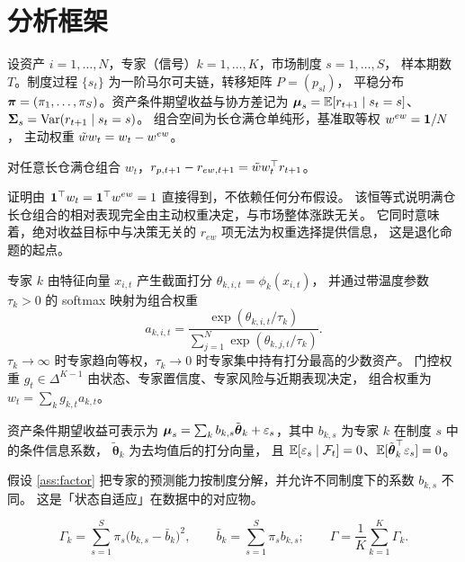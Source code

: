 \section{分析框架}
\label{sec:framework}

设资产 $i=1,\dots,N$，专家（信号）$k=1,\dots,K$，市场制度 $s=1,\dots,S$，
样本期数 $T$。制度过程 $\{s_t\}$ 为一阶马尔可夫链，转移矩阵 $P=(p_{sl})$，
平稳分布 $\boldsymbol{\pi}=(\pi_1,\dots,\pi_S)$。资产条件期望收益与协方差记为
$\boldsymbol{\mu}_s=\mathbb{E}[r_{t+1}\mid s_t=s]$、$\boldsymbol{\Sigma}_s=\mathrm{Var}(r_{t+1}\mid s_t=s)$。
组合空间为长仓满仓单纯形，基准取等权 $w^{ew}=\mathbf{1}/N$，
主动权重 $\tilde{w} w_t=w_t-w^{ew}$。

\begin{lemma}[基准恒等式]
\label{lem:identity}
对任意长仓满仓组合 $w_t$，$r_{p,t+1}-r_{ew,t+1}=\tilde{w} w_t^\top r_{t+1}$。
\end{lemma}

证明由 $\mathbf{1}^\top w_t=\mathbf{1}^\top w^{ew}=1$ 直接得到，不依赖任何分布假设。
该恒等式说明满仓长仓组合的相对表现完全由主动权重决定，与市场整体涨跌无关。
它同时意味着，绝对收益目标中与决策无关的 $r_{ew}$ 项无法为权重选择提供信息，
这是退化命题的起点。

专家 $k$ 由特征向量 $x_{i,t}$ 产生截面打分 $\theta_{k,i,t}=\phi_k(x_{i,t})$，
并通过带温度参数 $\tau_k>0$ 的 softmax 映射为组合权重
\begin{equation}
a_{k,i,t}=\frac{\exp(\theta_{k,i,t}/\tau_k)}{\sum_{j=1}^N\exp(\theta_{k,j,t}/\tau_k)} .
\label{eq:softmax-expert}
\end{equation}
$\tau_k\to\infty$ 时专家趋向等权，$\tau_k\to0$ 时专家集中持有打分最高的少数资产。
门控权重 $g_t\in\Delta^{K-1}$ 由状态、专家置信度、专家风险与近期表现决定，
组合权重为 $w_t=\sum_k g_{k,t}a_{k,t}$。

\begin{assumption}[制度切换因子结构]
\label{ass:factor}
资产条件期望收益可表示为 $\boldsymbol{\mu}_s=\sum_{k}b_{k,s}\tilde{\boldsymbol\theta}_{k}
+\varepsilon_s$，其中 $b_{k,s}$ 为专家 $k$ 在制度 $s$ 中的条件信息系数，
$\tilde{\boldsymbol\theta}_k$ 为去均值后的打分向量，
且 $\mathbb{E}[\varepsilon_s\mid\mathcal{F}_t]=0$、$\mathbb{E}[\tilde{\boldsymbol\theta}_k^\top\varepsilon_s]=0$。
\end{assumption}

假设 \ref{ass:factor} 把专家的预测能力按制度分解，并允许不同制度下的系数 $b_{k,s}$ 不同。
这是「状态自适应」在数据中的对应物。

\begin{definition}[信号—状态互补性]
\begin{equation}
\Gamma_k=\sum_{s=1}^S\pi_s\big(b_{k,s}-\bar b_k\big)^2,
\qquad \bar b_k=\sum_{s=1}^S\pi_s b_{k,s};
\qquad \Gamma=\frac1K\sum_{k=1}^K\Gamma_k .
\label{eq:gamma-def}
\end{equation}
\end{definition}

